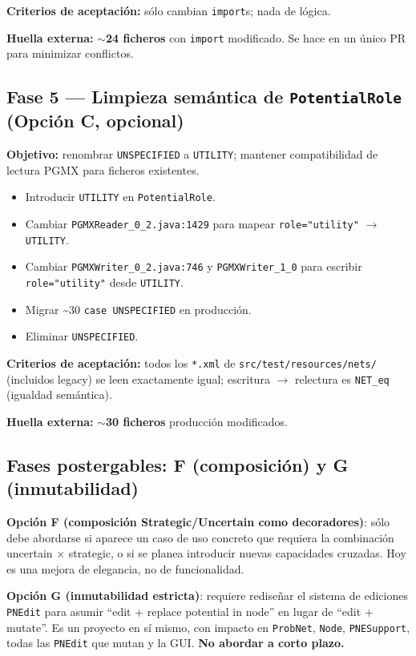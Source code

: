 \documentclass[11pt,a4paper]{article}
\newcommand{\code}[1]{\texttt{#1}}
\begin{document}
\textbf{Criterios de aceptación:} sólo cambian \code{import}s; nada de
lógica.

\textbf{Huella externa:} \textbf{$\sim$24 ficheros} con \code{import}
modificado. Se hace en un único PR para minimizar conflictos.

\subsection{Fase 5 --- Limpieza semántica de \code{PotentialRole}
(Opción C, opcional)}

\textbf{Objetivo:} renombrar \code{UNSPECIFIED} a \code{UTILITY}; mantener
compatibilidad de lectura PGMX para ficheros existentes.

\begin{itemize}[leftmargin=*]
  \item Introducir \code{UTILITY} en \code{PotentialRole}.
  \item Cambiar \code{PGMXReader\_0\_2.java:1429} para mapear
        \code{role="utility"} $\to$ \code{UTILITY}.
  \item Cambiar \code{PGMXWriter\_0\_2.java:746} y \code{PGMXWriter\_1\_0} para
        escribir \code{role="utility"} desde \code{UTILITY}.
  \item Migrar \textasciitilde 30 \code{case UNSPECIFIED} en producción.
  \item Eliminar \code{UNSPECIFIED}.
\end{itemize}

\textbf{Criterios de aceptación:} todos los \code{*.xml} de
\code{src/test/resources/nets/} (incluidos legacy) se leen exactamente igual;
escritura $\to$ relectura es \code{NET\_eq} (igualdad semántica).

\textbf{Huella externa:} \textbf{$\sim$30 ficheros} producción modificados.

\subsection{Fases postergables: F (composición) y G (inmutabilidad)}

\textbf{Opción F (composición Strategic/Uncertain como decoradores)}: sólo
debe abordarse si aparece un caso de uso concreto que requiera la
combinación uncertain $\times$ strategic, o si se planea introducir nuevas
capacidades cruzadas. Hoy es una mejora de elegancia, no de funcionalidad.

\textbf{Opción G (inmutabilidad estricta)}: requiere rediseñar el sistema de
ediciones \code{PNEdit} para asumir ``edit + replace potential in node''
en lugar de ``edit + mutate''. Es un proyecto en sí mismo, con impacto en
\code{ProbNet}, \code{Node}, \code{PNESupport}, todas las
\code{PNEdit} que mutan y la GUI. \textbf{No abordar a corto plazo.}
\end{document}
